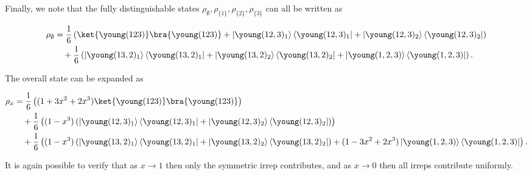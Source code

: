 Finally, we note that the fully distinguishable states $\rho_{\emptyset}, \rho_{\{1\}}, \rho_{\{2\}}, \rho_{\{3\}}$ can all be written as

\begin{align}
\rho_\emptyset &= \frac{1}{6}\left(\ket{\young(123)}\bra{\young(123)} + \left|\young(12,3)_1\right\rangle\left\langle\young(12,3)_1\right| + \left|\young(12,3)_2\right\rangle\left\langle\young(12,3)_2\right|\right)\nonumber\\
&\quad+\frac{1}{6}\left(\left|\young(13,2)_1\right\rangle\left\langle\young(13,2)_1\right| + \left|\young(13,2)_2\right\rangle\left\langle\young(13,2)_2\right| + \left|\young(1,2,3)\right\rangle\left\langle\young(1,2,3)\right|\right).
\end{align}

The overall state can be expanded as

\begin{align}
\rho_x &= \frac{1}{6}\left((1+3x^2+2x^3)\ket{\young(123)}\bra{\young(123)}\right)\nonumber\\
&\quad+\frac{1}{6}\left((1-x^3)\left(\left|\young(12,3)_1\right\rangle\left\langle\young(12,3)_1\right| + \left|\young(12,3)_2\right\rangle\left\langle\young(12,3)_2\right|\right)\right)\nonumber\\
&\quad+\frac{1}{6}\left((1-x^3)\left(\left|\young(13,2)_1\right\rangle\left\langle\young(13,2)_1\right| + \left|\young(13,2)_2\right\rangle\left\langle\young(13,2)_2\right|\right) + (1-3x^2+2x^3)\left|\young(1,2,3)\right\rangle\left\langle\young(1,2,3)\right|\right).
\end{align}

It is again possible to verify that as $x\rightarrow 1$ then only the symmetric irrep contributes, and as $x \rightarrow 0$ then all irreps contribute uniformly.

